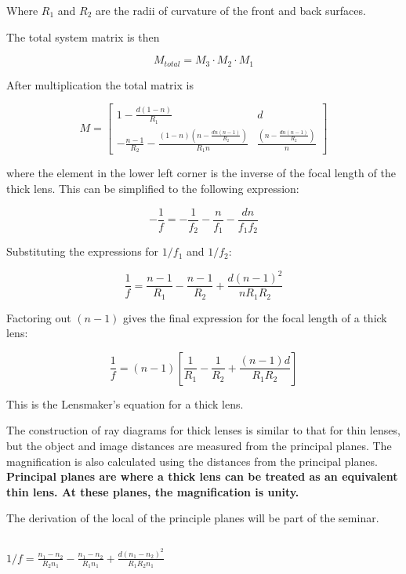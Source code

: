\documentclass[
  a4paper,
]{book}
\begin{document}
\begin{tcolorbox}
Where \(R_1\) and \(R_2\) are the radii of curvature of the front and
back surfaces.

The total system matrix is then

\[M_{total} = M_3 \cdot M_2 \cdot M_1\]

After multiplication the total matrix is

\[
M=\begin{bmatrix}
  1 - \frac{d \left(1 - n\right)}{R_{1}} & d\\
  - \frac{n-1}{R_{2} } - \frac{\left(1 - n\right) \left(n - \frac{d n \left( n-1\right)}{R_{2}}\right)}{R_{1} n} & \frac{\left(n - \frac{d n \left( n-1\right)}{R_{2}}\right)}{n}
\end{bmatrix}
\]

where the element in the lower left corner is the inverse of the focal
length of the thick lens. This can be simplified to the following
expression:

\[-\frac{1}{f} = -\frac{1}{f_2} - \frac{n}{f_1} -\frac{d n}{f_1f_2}\]

Substituting the expressions for \(1/f_1\) and \(1/f_2\):

\[\frac{1}{f} = \frac{n-1}{R_1} - \frac{n-1}{R_2} + \frac{d(n-1)^2}{nR_1R_2}\]

Factoring out \((n-1)\) gives the final expression for the focal length
of a thick lens:

\[\frac{1}{f} = (n-1)\left[\frac{1}{R_1} - \frac{1}{R_2} + \frac{(n-1)d}{R_1R_2}\right]\]

This is the Lensmaker's equation for a thick lens.

The construction of ray diagrams for thick lenses is similar to that for
thin lenses, but the object and image distances are measured from the
principal planes. The magnification is also calculated using the
distances from the principal planes. \textbf{Principal planes are where
a thick lens can be treated as an equivalent thin lens. At these planes,
the magnification is unity.}

The derivation of the local of the principle planes will be part of the
seminar.

\begin{verbatim}
\end{verbatim}

$\displaystyle 1/f =\frac{n_{1} - n_{2}}{R_{2} n_{1}} - \frac{n_{1} - n_{2}}{R_{1} n_{1}} + \frac{d \left(n_{1} - n_{2}\right)^{2}}{R_{1} R_{2} n_{1}}$

\end{tcolorbox}
\end{document}
